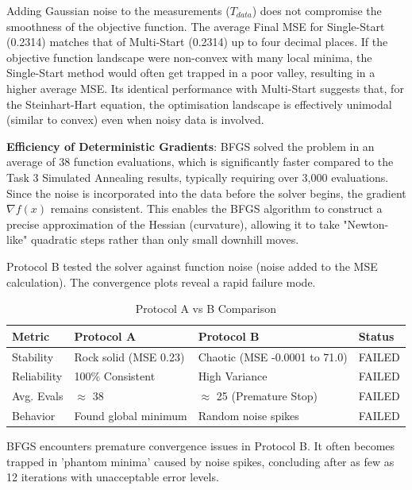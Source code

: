 Adding Gaussian noise to the measurements ($T_{data}$) does not compromise the smoothness of the objective function. The average Final MSE for Single-Start (0.2314) matches that of Multi-Start (0.2314) up to four decimal places. If the objective function landscape were non-convex with many local minima, the Single-Start method would often get trapped in a poor valley, resulting in a higher average MSE. Its identical performance with Multi-Start suggests that, for the Steinhart-Hart equation, the optimisation landscape is effectively unimodal (similar to convex) even when noisy data is involved.

\textbf{Efficiency of Deterministic Gradients}: BFGS solved the problem in an average of 38 function evaluations, which is significantly faster compared to the Task 3 Simulated Annealing results, typically requiring over 3,000 evaluations. Since the noise is incorporated into the data before the solver begins, the gradient $\nabla f(x)$ remains consistent. This enables the BFGS algorithm to construct a precise approximation of the Hessian (curvature), allowing it to take "Newton-like" quadratic steps rather than only small downhill moves.

Protocol B tested the solver against function noise (noise added to the MSE calculation). The convergence plots reveal a rapid failure mode.

\begin{table}[H]
    \centering
    \begin{tabular}{|l|l|l|l|}
    \hline
    Metric & Protocol A & Protocol B & Status \\ \hline
    Stability & Rock solid (MSE 0.23) & Chaotic (MSE -0.0001 to 71.0) & FAILED \\ \hline
    Reliability & 100\% Consistent & High Variance & FAILED \\ \hline
    Avg. Evals & $\approx$ 38 & $\approx$ 25 (Premature Stop) & FAILED \\ \hline
    Behavior & Found global minimum & Random noise spikes & FAILED \\ \hline
    \end{tabular}
    \caption{Protocol A vs B Comparison}
    \label{tab:sensor_protocol_ab}
\end{table}

BFGS encounters premature convergence issues in Protocol B. It often becomes trapped in 'phantom minima' caused by noise spikes, concluding after as few as 12 iterations with unacceptable error levels.


